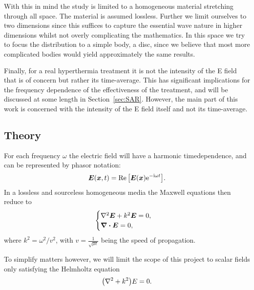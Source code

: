 \documentclass[11pt,a4paper, 
swedish,english %
]{article}
\begin{document}
With this in mind the study is limited to a homogeneous material stretching through all space. The material is assumed lossless. %
Further we limit ourselves to two dimensions since this suffices to capture the essential wave nature in higher dimensions whilst not overly complicating the mathematics. 
In this space we try to focus the distribution to a simple body, a disc, since we believe that most more complicated bodies would yield approximately the same results.


Finally, for a real hyperthermia treatment it is not the intensity of the E field that is of concern but rather its time-average. This has significant implications for the frequency dependence of the effectiveness of the treatment, and will be discussed at some length in Section~\ref{sec:SAR}. However, the main part of this work is concerned with the intensity of the E field itself and not its time-average.


\subsection{Theory}
For each frequency $\omega$ the electric field will have a harmonic timedependence, and can be represented by phasor notation:
\begin{equation}
  \label{eq:phasor}
\vb*E(\vb*x,t)=\Re\qty[\vb*E(\vb*x)\mathrm{e}^{-\mathrm{i}\omega t}].
\end{equation}
In a lossless and sourceless homogeneous media the Maxwell equations then reduce to
\begin{equation}
\begin{cases}
\laplacian  \vb*E + k^2\vb*E=0,\\
\div\vb*E = 0,
\end{cases}
\end{equation} 
where $k^2 = \omega^2/v^2$, with $v=\frac{1}{\sqrt{\mu \epsilon}}$ being the speed of propagation. 

To simplify matters however, we will limit the scope of this project to scalar fields only satisfying the Helmholtz equation
\begin{equation}
  \label{eq:Helmholtz}
  \qty(\laplacian + k^2)E=0.
\end{equation} 
\end{document}
